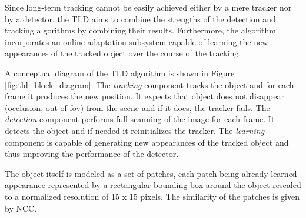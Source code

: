 Since long-term tracking cannot be easily achieved either by a mere tracker nor by a detector, the TLD aims to combine the strengths of the detection and tracking algorithms by combining their results. Furthermore, the algorithm incorporates an online adaptation subsystem capable of learning the new appearances of the tracked object over the course of the tracking.

A conceptual diagram of the TLD algorithm is shown in Figure \ref{fig:tld_block_diagram}. The \textit{tracking} component tracks the object and for each frame it produces the new position. It expects that object does not disappear (occlusion, out of \gls{fov}) from the scene and if it does, the tracker fails. The \textit{detection} component performs full scanning of the image for each frame. It detects the object and if needed it reinitializes the tracker. The \textit{learning} component is capable of generating new appearances of the tracked object and thus improving the performance of the detector. 

The object itself is modeled as a set of patches, each patch being already learned appearance represented by a rectangular bounding box around the object rescaled to a normalized resolution of 15 x 15 pixels. The similarity of the patches is given by NCC.

